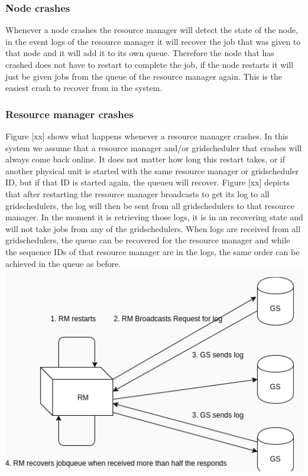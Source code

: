 \documentclass[a4paper]{article}
\begin{document}
\subsubsection{Node crashes}
Whenever a node crashes the resource manager will detect the state of the node, in the event logs of the resource manager it will recover the job that was given to that node and it will add it to its own queue.
Therefore the node that has crashed does not have to restart to complete the job, if the node restarts it will just be given jobs from the queue of the resource manager again.
This is the easiest crash to recover from in the system.

\subsubsection{Resource manager crashes}
Figure [xx] shows what happens whenever a resource manager crashes. 
In this system we assume that a resource manager and/or gridscheduler that crashes will always come back online.
It does not matter how long this restart takes, or if another physical unit is started with the same resource manager or gridscheduler ID, but if that ID is started again, the queueu will recover.
Figure [xx] depicts that after restarting the resource manager broadcasts to get its log to all gridschedulers, the log will then be sent from all gridschedulers to that resource manager.
In the moment it is retrieving those logs, it is in an recovering state and will not take jobs from any of the gridschedulers.
When logs are received from all gridschedulers, the queue can be recovered for the resource manager and while the sequence IDs of that resource manager are in the logs, the same order can be achieved in the queue as before. \\
\includegraphics[scale=0.5]{design-rm-crash.PNG}
\end{document}
